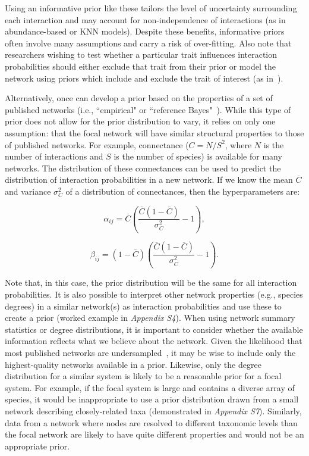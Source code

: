 \documentclass[12pt]{article}
\begin{document}
\begin{spacing}{2.0}
        Using an informative prior like these tailors the level of uncertainty surrounding each interaction and may account for non-independence of interactions (as in abundance-based or KNN models). Despite these benefits, informative priors often involve many assumptions and carry a risk of over-fitting. Also note that researchers wishing to test whether a particular trait influences interaction probabilities should either exclude that trait from their prior or model the network using priors which include and exclude the trait of interest (as in~\citet{Weinstein2017,Weinstein2017a}).


        Alternatively, once can develop a prior based on the properties of a set of published networks (i.e., ``empirical" or ``reference Bayes"~\citet{Spiegelhalter2000}). While this type of prior does not allow for the prior distribution to vary, it relies on only one assumption: that the focal network will have similar structural properties to those of published networks. For example, connectance ($C=N/S^2$, where $N$ is the number of interactions and $S$ is the number of species) is available for many networks. The distribution of these connectances can be used to predict the distribution of interaction probabilities in a new network. If we know the mean $\overline{C}$ and variance $\sigma_C^2$ of a distribution of connectances, then the hyperparameters are:

        \begin{equation}
        \alpha_{ij}=\overline{C}(\frac{\overline{C}(1-\overline{C})}{\sigma_C^2}-1) ,
        \end{equation}

        \begin{equation}
        \beta_{ij}=(1-\overline{C})(\frac{\overline{C}(1-\overline{C})}{\sigma_C^2}-1) .
        \end{equation}
  

        Note that, in this case, the prior distribution will be the same for all interaction probabilities. It is also possible to interpret other network properties (e.g., species degrees) in a similar network(s) as interaction probabilities and use these to create a prior (worked example in \emph{Appendix S4}). When using network summary statistics or degree distributions, it is important to consider whether the available information reflects what we believe about the network. Given the likelihood that most published networks are undersampled~\citep{Jordano2016}, it may be wise to include only the highest-quality networks available in a prior. Likewise, only the degree distribution for a similar system is likely to be a reasonable prior for a focal system. For example, if the focal system is large and contains a diverse array of species, it would be inappropriate to use a prior distribution drawn from a small network describing closely-related taxa (demonstrated in \emph{Appendix S7}). Similarly, data from a network where nodes are resolved to different taxonomic levels than the focal network are likely to have quite different properties and would not be an appropriate prior.



\end{spacing}
\end{document}

